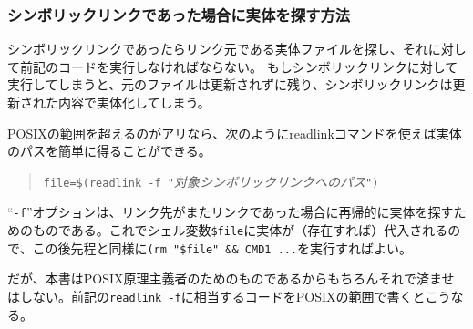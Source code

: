 \subsubsection*{シンボリックリンクであった場合に実体を探す方法}
シンボリックリンクであったらリンク元である実体ファイルを探し、それに対して前記のコードを実行しなければならない。
もしシンボリックリンクに対して実行してしまうと、元のファイルは更新されずに残り、シンボリックリンクは更新された内容で実体化してしまう。

POSIXの範囲を超えるのがアリなら、次のようにreadlinkコマンドを使えば実体のパスを簡単に得ることができる。
\begin{quotation}
	\verb!file=$(readlink -f "!\textit{対象シンボリックリンクへのパス}\verb!")!
\end{quotation}
``\verb|-f|''オプションは、リンク先がまたリンクであった場合に再帰的に実体を探すためのものである。これでシェル変数\verb!$file!に実体が（存在すれば）代入されるので、この後先程と同様に\verb!(rm "$file" && CMD1 ...!を実行すればよい。

だが、本書はPOSIX原理主義者のためのものであるからもちろんそれで済ませはしない。前記の\verb!readlink -f!に相当するコードをPOSIXの範囲で書くとこうなる。

